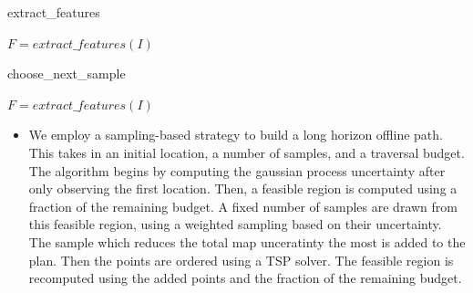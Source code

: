\begin{algorithm}
\caption{extract\_features}\label{alg:methods:extract_features}
\begin{algorithmic}
\State $F = extract\_features(I)$
\end{algorithmic}
\end{algorithm}

\begin{algorithm}
\caption{choose\_next\_sample}\label{alg:methods:choose_next_sample}
\begin{algorithmic}
\State $F = extract\_features(I)$
\end{algorithmic}
\end{algorithm}



\begin{itemize}
    \item We employ a sampling-based strategy to build a long horizon offline path. This takes in an initial location, a number of samples, and a traversal budget. The algorithm begins by computing the gaussian process uncertainty after only observing the first location. Then, a feasible region is computed using a fraction of the remaining budget. A fixed number of samples are drawn from this feasible region, using a weighted sampling based on their uncertainty. The sample which reduces the total map unceratinty the most is added to the plan. Then the points are ordered using a TSP solver. The feasible region is recomputed using the added points and the fraction of the remaining budget.
\end{itemize}